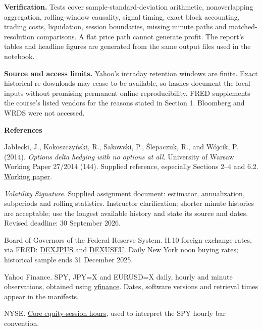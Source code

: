 \documentclass[11pt,letterpaper]{article}
\begin{document}
\textbf{Verification.} Tests cover sample-standard-deviation arithmetic, nonoverlapping aggregation, rolling-window causality, signal timing, exact block accounting, trading costs, liquidation, session boundaries, missing minute paths and matched-resolution comparisons. A flat price path cannot generate profit. The report's tables and headline figures are generated from the same output files used in the notebook.

\textbf{Source and access limits.} Yahoo's intraday retention windows are finite. Exact historical re-downloads may cease to be available, so hashes document the local inputs without promising permanent online reproducibility. FRED supplements the course's listed vendors for the reasons stated in Section 1. Bloomberg and WRDS were not accessed.

\vspace{7pt}\textbf{References}

Jabłecki, J., Kokoszczyński, R., Sakowski, P., Ślepaczuk, R., and Wójcik, P. (2014). \emph{Options delta hedging with no options at all}. University of Warsaw Working Paper 27/2014 (144). Supplied reference, especially Sections 2–4 and 6.2. \href{https://www.wne.uw.edu.pl/inf/wyd/WP/WNE_WP144.pdf}{Working paper}.

\emph{Volatility Signature}. Supplied assignment document: estimator, annualization, subperiods and rolling statistics. Instructor clarification: shorter minute histories are acceptable; use the longest available history and state its source and dates. Revised deadline: 30 September 2026.

Board of Governors of the Federal Reserve System. H.10 foreign exchange rates, via FRED: \href{https://fred.stlouisfed.org/series/DEXJPUS}{DEXJPUS} and \href{https://fred.stlouisfed.org/series/DEXUSEU}{DEXUSEU}. Daily New York noon buying rates; historical sample ends 31 December 2025.

Yahoo Finance. SPY, JPY=X and EURUSD=X daily, hourly and minute observations, obtained using \href{https://ranaroussi.github.io/yfinance/reference/api/yfinance.download.html}{yfinance}. Dates, software versions and retrieval times appear in the manifests.

NYSE. \href{https://www.nyse.com/trade/equities/extended-hours-trading}{Core equity-session hours}, used to interpret the SPY hourly bar convention.
\end{document}
